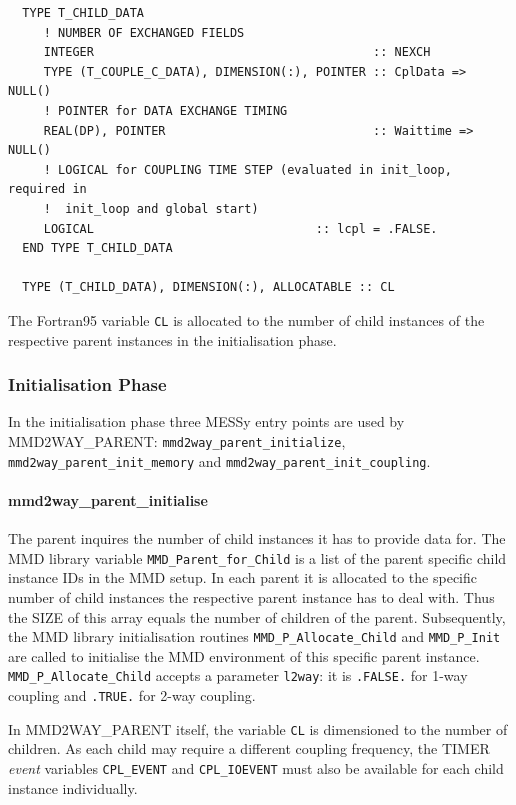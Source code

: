 \documentclass[11pt,twoside]{article}
\begin{document}
\begin{verbatim}
  TYPE T_CHILD_DATA
     ! NUMBER OF EXCHANGED FIELDS
     INTEGER                                       :: NEXCH
     TYPE (T_COUPLE_C_DATA), DIMENSION(:), POINTER :: CplData => NULL()
     ! POINTER for DATA EXCHANGE TIMING
     REAL(DP), POINTER                             :: Waittime => NULL()
     ! LOGICAL for COUPLING TIME STEP (evaluated in init_loop, required in
     !  init_loop and global start)
     LOGICAL                               :: lcpl = .FALSE.
  END TYPE T_CHILD_DATA

  TYPE (T_CHILD_DATA), DIMENSION(:), ALLOCATABLE :: CL
\end{verbatim}
The Fortran95 variable \verb|CL| is allocated to the number of child
instances of the respective parent instances in the initialisation phase.

\subsubsection{Initialisation Phase}\label{sec:c2pParentInit}
In the initialisation phase three MESSy entry points are used by
MMD2WAY\_PARENT:
\verb|mmd2way_parent_initialize|, \verb|mmd2way_parent_init_memory| and
\verb|mmd2way_parent_init_coupling|.
\paragraph{\bf mmd2way\_parent\_initialise\\}
The parent inquires the number of child instances it has to provide data 
for. The MMD library variable \verb|MMD_Parent_for_Child| is a list of the
 parent specific child instance IDs in the MMD setup. In each parent it is
 allocated to the specific number of child instances the respective
 parent instance has to deal
 with. Thus the {\footnotesize SIZE} of this array equals the number of 
children  of the parent.
Subsequently, the MMD library initialisation routines 
\verb|MMD_P_Allocate_Child| and 
\verb|MMD_P_Init| are called to initialise the MMD environment of this 
specific parent instance. \verb|MMD_P_Allocate_Child| accepts a
parameter \verb|l2way|: it is \verb|.FALSE.| for 1-way coupling
and \verb|.TRUE.| for 2-way coupling.

In MMD2WAY\_PARENT itself, the variable \verb|CL| is dimensioned
to the number of children. As each child may require a different coupling 
frequency, the TIMER {\it event} variables \verb|CPL_EVENT| and 
\verb|CPL_IOEVENT| must also be available for each child instance individually.
\end{document}
